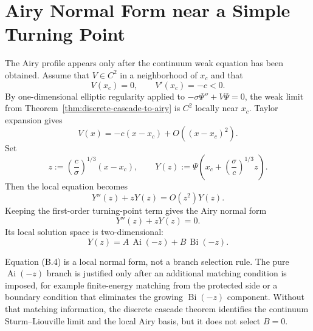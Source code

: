 \section{Airy Normal Form near a Simple Turning Point}
\label{app:airy-normal-form}

The Airy profile appears only after the continuum weak equation has been
obtained.  Assume that $V\in C^2$ in a neighborhood of $x_c$ and that
\[
  V(x_c)=0,
  \qquad
  V'(x_c)=-c<0 .
  \tag{B.1}
\]
By one-dimensional elliptic regularity applied to
$-\sigma\Psi''+V\Psi=0$, the weak limit from
Theorem~\ref{thm:discrete-cascade-to-airy} is $C^2$ locally near $x_c$.
Taylor expansion gives
\[
  V(x)=-c(x-x_c)+O((x-x_c)^2).
\]
Set
\[
  z := \left(\frac{c}{\sigma}\right)^{1/3}(x-x_c),
  \qquad
  Y(z):=\Psi\!\left(x_c+\left(\frac{\sigma}{c}\right)^{1/3}z\right).
\]
Then the local equation becomes
\[
  Y''(z)+zY(z)=O(z^2)Y(z).
  \tag{B.2}
\]
Keeping the first-order turning-point term gives the Airy normal form
\[
  Y''(z)+zY(z)=0.
  \tag{B.3}
\]
Its local solution space is two-dimensional:
\[
  Y(z)=A\,\operatorname{Ai}(-z)+B\,\operatorname{Bi}(-z).
  \tag{B.4}
\]

Equation (B.4) is a local normal form, not a branch selection rule.  The pure
$\operatorname{Ai}(-z)$ branch is justified only after an additional matching
condition is imposed, for example finite-energy matching from the protected
side or a boundary condition that eliminates the growing
$\operatorname{Bi}(-z)$ component.  Without that matching information, the
discrete cascade theorem identifies the continuum Sturm--Liouville limit and
the local Airy basis, but it does not select $B=0$.
